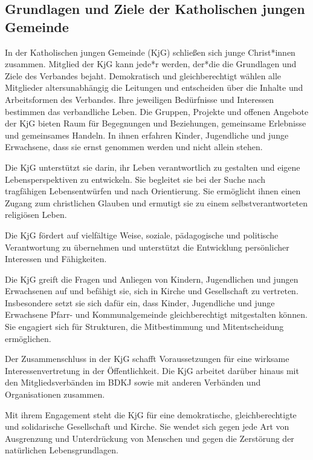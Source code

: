 \documentclass[12pt]{report}
\begin{document}
\begin{flushleft}

\chapter{Grundlagen und Ziele der Katholischen jungen Gemeinde}
In der Katholischen jungen Gemeinde (KjG) schließen sich junge Christ*innen zusammen. 
Mitglied der KjG kann jede*r werden, der*die die Grundlagen und Ziele des Verbandes bejaht.
Demokratisch und gleichberechtigt wählen alle Mitglieder altersunabhängig die Leitungen und
entscheiden über die Inhalte und Arbeitsformen des Verbandes.
Ihre jeweiligen Bedürfnisse und Interessen bestimmen das verbandliche Leben. Die Gruppen,
Projekte und offenen Angebote der KjG bieten Raum für Begegnungen und Beziehungen,
gemeinsame Erlebnisse und gemeinsames Handeln. In ihnen erfahren Kinder, Jugendliche und junge
Erwachsene, dass sie ernst genommen werden und nicht allein stehen.

Die KjG unterstützt sie darin, ihr Leben verantwortlich zu gestalten und eigene Lebensperspektiven zu entwickeln.
Sie begleitet sie bei der Suche nach tragfähigen Lebensentwürfen und nach Orientierung.
Sie ermöglicht ihnen einen Zugang zum christlichen Glauben und ermutigt sie zu einem selbstverantworteten religiösen Leben.

Die KjG fördert auf vielfältige Weise, soziale, pädagogische und politische Verantwortung zu
übernehmen und unterstützt die Entwicklung persönlicher Interessen und Fähigkeiten.

Die KjG greift die Fragen und Anliegen von Kindern, Jugendlichen und jungen Erwachsenen auf
und befähigt sie, sich in Kirche und Gesellschaft zu vertreten. Insbesondere setzt sie sich dafür
ein, dass Kinder, Jugendliche und junge Erwachsene Pfarr- und Kommunalgemeinde gleichberechtigt mitgestalten können.
Sie engagiert sich für Strukturen, die Mitbestimmung und Mitentscheidung ermöglichen.

Der Zusammenschluss in der KjG schafft Voraussetzungen für eine wirksame Interessenvertretung in der Öffentlichkeit.
Die KjG arbeitet darüber hinaus mit den Mitgliedsverbänden im BDKJ
sowie mit anderen Verbänden und Organisationen zusammen.

Mit ihrem Engagement steht die KjG für eine demokratische, gleichberechtigte und solidarische
Gesellschaft und Kirche. Sie wendet sich gegen jede Art von Ausgrenzung und Unterdrückung von
Menschen und gegen die Zerstörung der natürlichen Lebensgrundlagen.


\end{flushleft}
\end{document}
